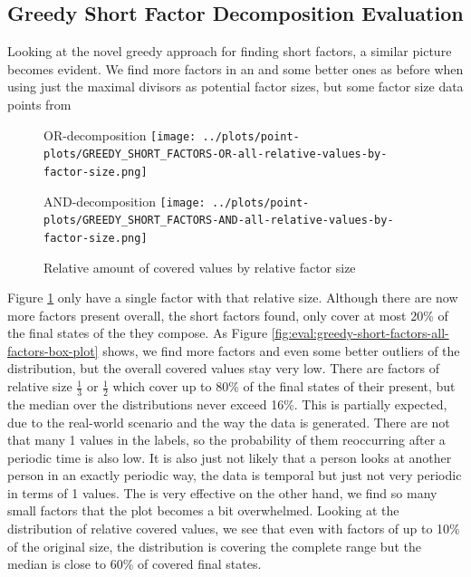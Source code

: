 \subsection{Greedy Short Factor Decomposition Evaluation}
\label{ch:Evaluation:decomposition-quality:greedy-short-factors}
Looking at the novel greedy approach for finding short factors, a similar picture becomes evident.
We find more factors in an \orDecomp and some better ones as before when using just the maximal divisors as potential factor sizes, but some factor size data points from 
\begin{figure}[h]
	\begin{minipage}[h]{0.49\linewidth}
		\centering
		OR-decomposition
		\texttt{[image: ../plots/point-plots/GREEDY\_SHORT\_FACTORS-OR-all-relative-values-by-factor-size.png]}
	\end{minipage}
	\begin{minipage}[h]{0.49\linewidth}
		\centering
		AND-decomposition
		\texttt{[image: ../plots/point-plots/GREEDY\_SHORT\_FACTORS-AND-all-relative-values-by-factor-size.png]}
	\end{minipage}
	\caption{Relative amount of covered values by relative factor size}
	\label{fig:eval:greedy-short-factors-all-factors}
\end{figure}
Figure \ref{fig:eval:greedy-short-factors-all-factors} only have a single factor with that relative size.
Although there are now more factors present overall, the short factors found, only cover at most 20\% of the final states of the \DFA they compose.
As Figure \ref{fig:eval:greedy-short-factors-all-factors-box-plot} shows, we find more factors and even some better outliers of the distribution, but the overall covered values stay very low.
There are factors of relative size $\frac{1}{3}$ or $\frac{1}{2}$ which cover up to 80\% of the final states of their \DFA present, but the median over the distributions never exceed 16\%.
This is partially expected, due to the real-world scenario and the way the data is generated.
There are not that many 1 values in the labels, so the probability of them reoccurring after a periodic time is also low.
It is also just not likely that a person looks at another person in an exactly periodic way, the data is temporal but just not very periodic in terms of 1 values.
The \andDecomp is very effective on the other hand, we find so many small factors that the plot becomes a bit overwhelmed.
Looking at the distribution of relative covered values, we see that even with factors of up to 10\% of the original size, the distribution is covering the complete range but the median is close to 60\% of covered final states.

